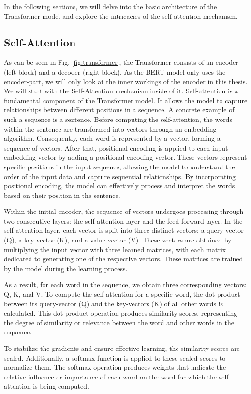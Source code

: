 \documentclass[a4paper,10pt]{report} %
\begin{document}
In the following sections, we will delve into the basic architecture of the Transformer model and explore the intricacies of the self-attention mechanism.

\subsection{Self-Attention}
As can be seen in Fig. \ref{fig:transformer}, the Transformer consists of an encoder (left block) and a decoder (right block). As the BERT model only uses the encoder-part, we will only look at the inner workings of the encoder in this thesis. We will start with the Self-Attention mechanism inside of it.
Self-attention is a fundamental component of the Transformer model. It allows the model to capture relationships between different positions in a sequence. A concrete example of such a sequence is a sentence. Before computing the self-attention, the words within the sentence are transformed into vectors through an embedding algorithm. Consequently, each word is represented by a vector, forming a sequence of vectors. After that, positional encoding is applied to each input embedding vector by adding a positional encoding vector. These vectors represent specific positions in the input sequence, allowing the model to understand the order of the input data and capture sequential relationships. By incorporating positional encoding, the model can effectively process and interpret the words based on their position in the sentence.

Within the initial encoder, the sequence of vectors undergoes processing through two consecutive layers: the self-attention layer and the feed-forward layer. In the self-attention layer, each vector is split into three distinct vectors: a query-vector (Q), a key-vector (K), and a value-vector (V). These vectors are obtained by multiplying the input vector with three learned matrices, with each matrix dedicated to generating one of the respective vectors. These matrices are trained by the model during the learning process.

As a result, for each word in the sequence, we obtain three corresponding vectors: Q, K, and V. To compute the self-attention for a specific word, the dot product between its query-vector (Q) and the key-vectors (K) of all other words is calculated. This dot product operation produces similarity scores, representing the degree of similarity or relevance between the word and other words in the sequence.

To stabilize the gradients and ensure effective learning, the similarity scores are scaled. Additionally, a softmax function is applied to these scaled scores to normalize them. The softmax operation produces weights that indicate the relative influence or importance of each word on the word for which the self-attention is being computed.
\end{document}
